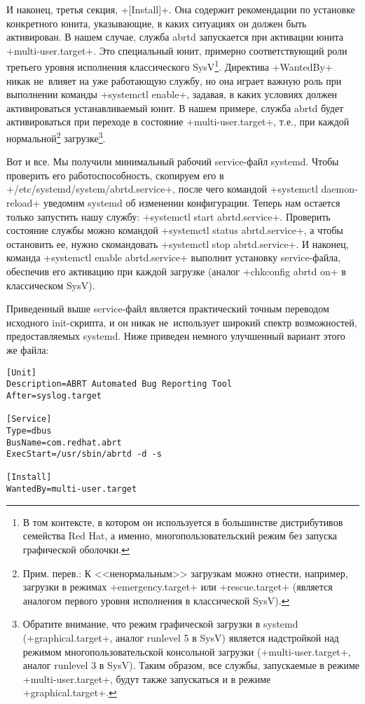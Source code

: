 \documentclass[10pt,oneside,a4paper]{article}
\begin{document}
И наконец, третья секция, +[Install]+. Она содержит рекомендации по
установке конкретного юнита, указывающие, в каких ситуациях он должен быть
активирован.  В нашем случае, служба abrtd запускается при активации юнита
+multi-user.target+. Это специальный юнит, примерно соответствующий роли
третьего уровня исполнения классического SysV\footnote{В том контексте, в
котором он используется в большинстве дистрибутивов семейства Red Hat, а
именно, многопользовательский режим без запуска графической оболочки.}.
Директива +WantedBy+ никак не~влияет на уже работающую службу, но она
играет важную роль при выполнении команды +systemctl enable+, задавая, в каких
условиях должен активироваться устанавливаемый юнит. В нашем примере, служба
abrtd будет активироваться при переходе в состояние +multi-user.target+,
т.е., при каждой нормальной\footnote{Прим. перев.: К <<ненормальным>> загрузкам
можно отнести, например, загрузки в режимах +emergency.target+ или
+rescue.target+ (является аналогом первого уровня исполнения в классической
SysV).} загрузке\footnote{Обратите внимание, что режим графической загрузки в
systemd (+graphical.target+, аналог runlevel 5 в SysV) является надстройкой над
режимом многопользовательской консольной загрузки (+multi-user.target+, аналог
runlevel 3 в SysV). Таким образом, все службы, запускаемые в режиме
+multi-user.target+, будут также запускаться и в режиме +graphical.target+.}.

Вот и все. Мы получили минимальный рабочий service-файл systemd. Чтобы
проверить его работоспособность, скопируем его в
+/etc/systemd/system/abrtd.service+, после чего командой
+systemctl daemon-reload+ уведомим systemd об изменении конфигурации.
Теперь нам остается только запустить нашу службу:
+systemctl start abrtd.service+.  Проверить состояние службы можно
командой +systemctl status abrtd.service+, а чтобы остановить ее, нужно
скомандовать +systemctl stop abrtd.service+. И наконец, команда
+systemctl enable abrtd.service+ выполнит установку service-файла,
обеспечив его активацию при каждой загрузке (аналог +chkconfig abrtd on+
в классическом SysV).

Приведенный выше service-файл является практический точным переводом
исходного init-скрипта, и он никак не~использует широкий спектр возможностей,
предоставляемых systemd. Ниже приведен немного улучшенный вариант этого же
файла: 

\begin{Verbatim}
[Unit]
Description=ABRT Automated Bug Reporting Tool
After=syslog.target

[Service]
Type=dbus
BusName=com.redhat.abrt
ExecStart=/usr/sbin/abrtd -d -s

[Install]
WantedBy=multi-user.target
\end{Verbatim}
\end{document}
